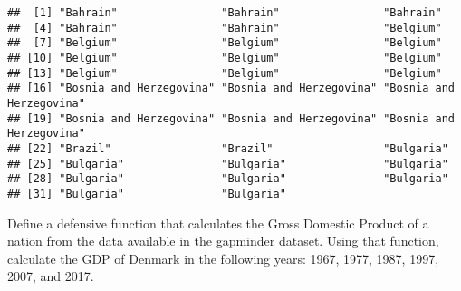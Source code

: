 \documentclass[]{article}
\newenvironment{Shaded}{\begin{snugshade}}{\end{snugshade}}
\newcommand{\KeywordTok}[1]{\textcolor[rgb]{0.13,0.29,0.53}{\textbf{#1}}}
\newcommand{\DataTypeTok}[1]{\textcolor[rgb]{0.13,0.29,0.53}{#1}}
\newcommand{\StringTok}[1]{\textcolor[rgb]{0.31,0.60,0.02}{#1}}
\newcommand{\CommentTok}[1]{\textcolor[rgb]{0.56,0.35,0.01}{\textit{#1}}}
\newcommand{\ControlFlowTok}[1]{\textcolor[rgb]{0.13,0.29,0.53}{\textbf{#1}}}
\newcommand{\OperatorTok}[1]{\textcolor[rgb]{0.81,0.36,0.00}{\textbf{#1}}}
\newcommand{\NormalTok}[1]{#1}
\begin{document}
\begin{verbatim}
##  [1] "Bahrain"                "Bahrain"                "Bahrain"               
##  [4] "Bahrain"                "Bahrain"                "Belgium"               
##  [7] "Belgium"                "Belgium"                "Belgium"               
## [10] "Belgium"                "Belgium"                "Belgium"               
## [13] "Belgium"                "Belgium"                "Belgium"               
## [16] "Bosnia and Herzegovina" "Bosnia and Herzegovina" "Bosnia and Herzegovina"
## [19] "Bosnia and Herzegovina" "Bosnia and Herzegovina" "Bosnia and Herzegovina"
## [22] "Brazil"                 "Brazil"                 "Bulgaria"              
## [25] "Bulgaria"               "Bulgaria"               "Bulgaria"              
## [28] "Bulgaria"               "Bulgaria"               "Bulgaria"              
## [31] "Bulgaria"               "Bulgaria"
\end{verbatim}

Define a defensive function that calculates the Gross Domestic Product
of a nation from the data available in the gapminder dataset. Using that
function, calculate the GDP of Denmark in the following years: 1967,
1977, 1987, 1997, 2007, and 2017.

\begin{Shaded}
\end{Shaded}
\end{document}
